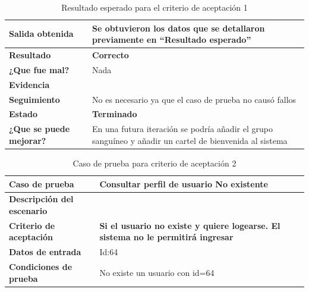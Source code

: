 {    {\scriptsize
	\begin{table}[h]
	\centering
	\begin{tabular}{|l|p{10cm}|}
	    \hline 
	    \textbf{Salida obtenida}&Se obtuvieron los datos que se detallaron previamente en ``Resultado esperado''\\ \hline
	    \textbf{Resultado}& \textbf{Correcto}\\ \hline
        \textbf{¿Que fue mal?}& Nada\\ \hline      
        \textbf{Evidencia}&  \\ \hline
        \textbf{Seguimiento}& No es necesario ya que el caso de prueba no causó fallos \\ \hline
        \textbf{Estado}& \textbf{Terminado}\\ \hline        
        \textbf{¿Que se puede mejorar?}& En una futura iteración se podría añadir el grupo sanguíneo y añadir un cartel de bienvenida al sistema \\ \hline              
	    \end{tabular}
        \caption{Resultado esperado para el criterio de aceptación 1}
    	\end{table}
	}
    

    
\clearpage    
    
    {\scriptsize
	\begin{table}[h]
	\centering
	\begin{tabular}{||l|p{10cm}||}
    	\rowcolor[gray]{0.9}
	    \hline 
        \hline 
	    \textbf{Caso de prueba} & \textbf{Consultar perfil de usuario No existente} \\  \hline
	    \textbf{Descripción del escenario}&\\ \hline
	    \textbf{Criterio de aceptación}&\textbf{Si el usuario no existe y quiere logearse. El sistema no le permitirá ingresar}\\ \hline
        \textbf{Datos de entrada}&  Id:64\\ \hline
        \textbf{Condiciones de  prueba}& No existe un usuario con id=64 \\ \hline \hline
	    \end{tabular}
        \caption{Caso de prueba para criterio de aceptación 2}
    	\end{table}
	}
    
}
